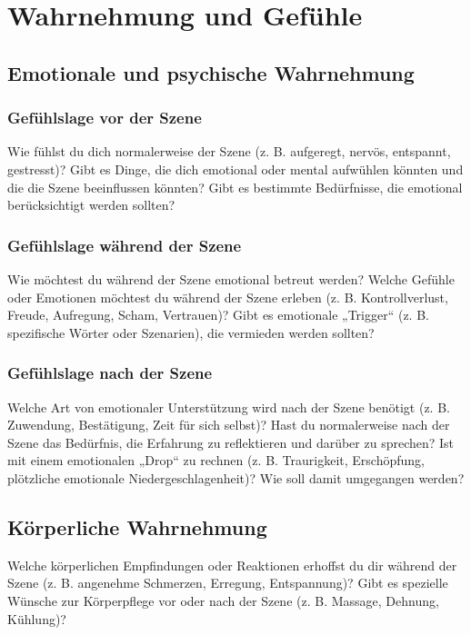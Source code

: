 \documentclass[a4paper,12pt]{article}
\begin{document}

\newpage
\section{Wahrnehmung und Gefühle}
\subsection{Emotionale und psychische Wahrnehmung}
\subsubsection{Gefühlslage vor der Szene}
\noindent Wie fühlst du dich normalerweise der Szene (z. B. aufgeregt, nervös, entspannt, gestresst)? Gibt es Dinge, die dich emotional oder mental aufwühlen könnten und die die Szene beeinflussen könnten? Gibt es bestimmte Bedürfnisse, die emotional berücksichtigt werden sollten? \newline
\noindent \TextField[name=WahrVor,multiline=true,height=10em, width=37em]{}

\subsubsection{Gefühlslage während der Szene}
\noindent Wie möchtest du während der Szene emotional betreut werden? Welche Gefühle oder Emotionen möchtest du während der Szene erleben (z. B. Kontrollverlust, Freude, Aufregung, Scham, Vertrauen)? Gibt es emotionale „Trigger“ (z. B. spezifische Wörter oder Szenarien), die vermieden werden sollten?\newline
\noindent \TextField[name=WahrWae,multiline=true,height=10em, width=37em]{}

\subsubsection{Gefühlslage nach der Szene}
\noindent Welche Art von emotionaler Unterstützung wird nach der Szene benötigt (z. B. Zuwendung, Bestätigung, Zeit für sich selbst)? Hast du normalerweise nach der Szene das Bedürfnis, die Erfahrung zu reflektieren und darüber zu sprechen? Ist mit einem emotionalen „Drop“ zu rechnen (z. B. Traurigkeit, Erschöpfung, plötzliche emotionale Niedergeschlagenheit)? Wie soll damit umgegangen werden? \newline
\noindent \TextField[name=WahrNach,multiline=true,height=10em, width=37em]{}
        
\subsection{Körperliche Wahrnehmung}
\noindent Welche körperlichen Empfindungen oder Reaktionen erhoffst du dir während der Szene (z. B. angenehme Schmerzen, Erregung, Entspannung)? Gibt es spezielle Wünsche zur Körperpflege vor oder nach der Szene (z. B. Massage, Dehnung, Kühlung)? \newline
\noindent \TextField[name=WahrKoer,multiline=true,height=10em, width=37em]{}
\end{document}
